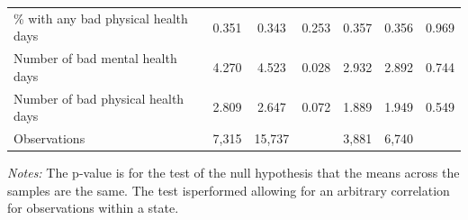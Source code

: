 \begin{table}[htbp]
{\begin{tabular}{lcccccc}
\% with any bad physical health days & 0.351 & 0.343 & 0.253 & 0.357 & 0.356 & 0.969 \\
Number of bad mental health days & 4.270 & 4.523 & 0.028 & 2.932 & 2.892 & 0.744 \\
Number of bad physical health days & 2.809 & 2.647 & 0.072 & 1.889 & 1.949 & 0.549 \\
\midrule
Observations & 7,315 & 15,737 & & 3,881 & 6,740 & \\
\bottomrule
\end{tabular}}
\begin{minipage}{\linewidth}
\smallskip\footnotesize
\textit{Notes:} The p-value is for the test of the null hypothesis that the means across the samples are the same. The test isperformed allowing for an arbitrary correlation for observations within a state.
\end{minipage}
\end{table}
